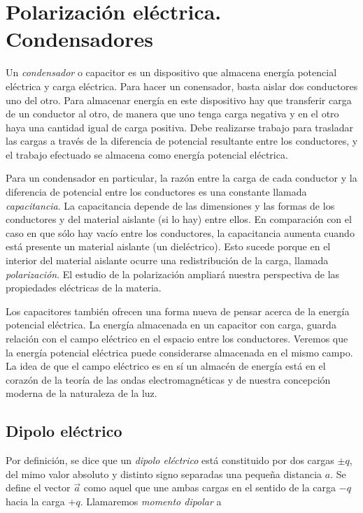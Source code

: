 \chapter{Polarización eléctrica. Condensadores}


\begin{miparrafo}
Un \emph{condensador} o capacitor es un dispositivo que almacena energía potencial eléctrica y carga eléctrica. Para hacer un conensador, basta aislar dos conductores uno del otro. Para almacenar energía en este dispositivo hay que transferir carga de un conductor al otro, de manera que uno tenga carga negativa y en el otro haya una cantidad igual de carga positiva. Debe realizarse trabajo para trasladar las cargas a través de la diferencia de potencial resultante entre los conductores, y el trabajo efectuado se almacena como energía potencial eléctrica. 

Para un condensador en particular, la razón entre la carga de cada conductor y la diferencia de potencial entre los conductores es una constante llamada \emph{capacitancia}. La capacitancia depende de las dimensiones y las formas de los conductores y del material aislante (si lo hay) entre ellos. En comparación con el caso en que sólo hay vacío entre los conductores, la capacitancia aumenta cuando está presente un material aislante (un dieléctrico). Esto sucede porque en el interior del material aislante ocurre una redistribución de la carga, llamada \emph{polarización}. El estudio de la polarización ampliará nuestra perspectiva de las propiedades eléctricas de la materia. 

Los capacitores también ofrecen una forma nueva de pensar acerca de la energía potencial eléctrica. La energía almacenada en un capacitor con carga, guarda relación con el campo eléctrico en el espacio entre los conductores. Veremos que la energía potencial eléctrica puede considerarse almacenada en el mismo campo. La idea de que el campo eléctrico es en sí un almacén de energía está en el corazón de la teoría de las ondas electromagnéticas y de nuestra concepción moderna de la naturaleza de la luz. 	
\end{miparrafo}


\section{Dipolo eléctrico}

Por definición, se dice que un \emph{dipolo eléctrico} está constituido por dos cargas $\pm q$, del mimo valor absoluto y distinto signo separadas una pequeña distancia $a$. Se define el vector $\vec a$ como aquel que une ambas cargas en el sentido  de la carga $-q$ hacia la carga $+q$. Llamaremos \emph{momento dipolar} a

